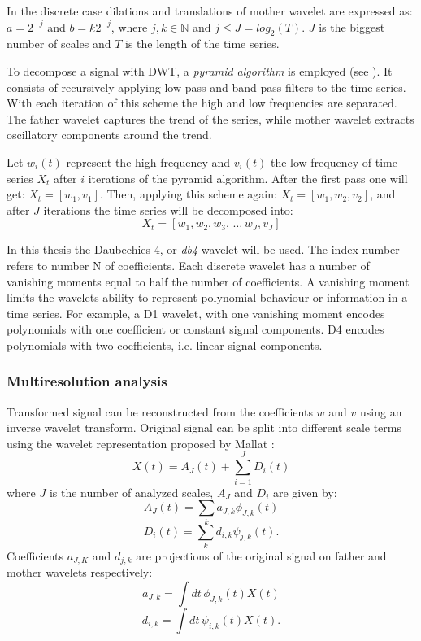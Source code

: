 In the discrete case dilations and translations of mother wavelet are expressed as:
$a=2^{-j}$ and $b=k 2^{-j}$, where $j, k \in \mathbb{N}$ and $j \leq J = log_2(T)$.
$J$ is the biggest number of scales and $T$ is the length of the time series.

To decompose a signal with DWT, a \emph{pyramid algorithm} is employed (see ).
It consists of recursively applying low-pass and band-pass filters to the time series.
With each iteration of this scheme the high and low frequencies are separated.
The father wavelet captures the trend of the series, while mother wavelet extracts oscillatory components around the trend.

Let $w_i(t)$ represent the high frequency and $v_i(t)$ the low frequency of time series $X_t$ after $i$ iterations of the pyramid algorithm.
After the first pass one will get: $X_t = [w_1, v_1]$.
Then, applying this scheme again: $X_t = [w_1, w_2, v_2]$, and after $J$ iterations the time series will be decomposed into:
\begin{equation}
	X_t = [w_1, w_2, w_3, \, \dots \, w_J, v_J]
\end{equation}

In this thesis the Daubechies 4, or \emph{db4} wavelet will be used.
The index number refers to number N of coefficients.
Each discrete wavelet has a number of vanishing moments equal to half the number of coefficients.
A vanishing moment limits the wavelets ability to represent polynomial behaviour or information in a time series.
For example, a D1 wavelet, with one vanishing moment encodes polynomials with one coefficient or constant signal components.
D4 encodes polynomials with two coefficients, i.e. linear signal components. 



\subsubsection{Multiresolution analysis}
Transformed signal can be reconstructed from the coefficients $w$ and $v$ using an inverse wavelet transform.
Original signal can be split into different scale terms using the wavelet representation proposed by Mallat \cite{mallat1989}:
\begin{equation} \label{eq:decomposed}
	X(t) = A_J(t) + \sum_{i=1}^{J} D_i(t)
\end{equation}
where $J$ is the number of analyzed scales, $A_J$ and $D_i$ are given by:
\begin{equation}
	A_J(t) = \sum_k a_{J,k} \phi_{J,k}(t)
\end{equation}
\begin{equation}
	D_i(t) = \sum_k d_{i,k} \psi_{j,k}(t).
\end{equation}
Coefficients $a_{J,K}$ and $d_{j,k}$ are projections of the original signal on father and mother wavelets respectively:
\begin{equation}
	a_{J,k} = \int dt \, \phi_{J,k}(t) X(t)
\end{equation}
\begin{equation}
	d_{i,k} = \int dt \, \psi_{i,k}(t) X(t).
\end{equation}


